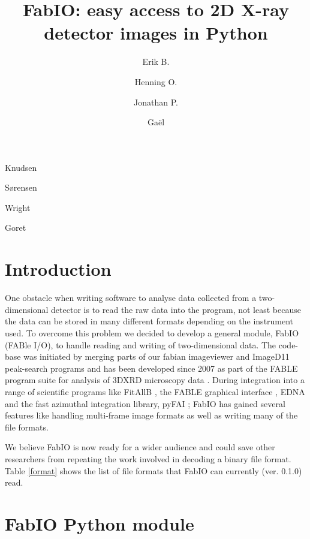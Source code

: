 \documentclass[preprint ]{iucr}
\begin{document}
\title{FabIO: easy access to 2D X-ray detector images in Python}

    \author[a]{Erik B.}{Knudsen}
    \author[b]{Henning O.}{S{\o}rensen}
    \author[c]{Jonathan P.}{Wright}
    \author[c]{Ga\"el}{Goret}

\maketitle

\section{Introduction}

One obstacle when writing software to analyse data collected from a
two-dimensional detector is to read the raw data into the program,
not least because the data can be stored in many different formats
depending on the instrument used.
To overcome this problem we decided to develop a general module,
FabIO (FABle I/O), to handle reading and writing of two-dimensional
data.
The code-base was initiated by merging parts of our fabian imageviewer
\cite{fabian} and ImageD11 \cite{ImageD11} peak-search programs and has
been developed since 2007 as part of the FABLE \cite{fable} program suite
for analysis of 3DXRD microscopy data \cite{3dxrd}.
During integration into a range of scientific programs like FitAllB
\cite{fitallb}, the FABLE graphical interface \cite{fable}, EDNA \cite{edna} and
the fast azimuthal integration library, pyFAI \cite{pyfai}; FabIO has gained
several features like handling multi-frame image formats as well as
writing many of the file formats.

We believe FabIO is now ready for a wider audience and could save other
researchers from repeating the work involved in decoding a
binary file format. Table \ref{format} shows the list of file formats that
FabIO can currently (ver. 0.1.0) read.


\section{FabIO Python module}
\end{document}
